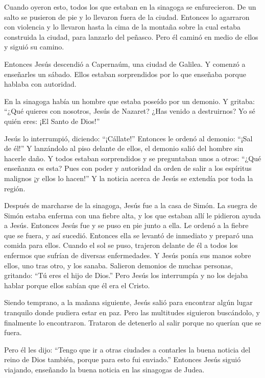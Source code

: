  Cuando oyeron esto, todos los que estaban en la sinagoga
se enfurecieron.  De un salto se pusieron de pie y lo
llevaron fuera de la ciudad. Entonces lo agarraron con violencia y lo
llevaron hasta la cima de la montaña sobre la cual estaba construida la
ciudad, para lanzarlo del peñasco.  Pero él caminó en medio
de ellos y siguió su camino.

 Entonces Jesús descendió a Capernaúm, una ciudad de
Galilea. Y comenzó a enseñarles un sábado.  Ellos estaban
sorprendidos por lo que enseñaba porque hablaba con autoridad.

 En la sinagoga había un hombre que estaba poseído por un
demonio. Y gritaba:  ``¿Qué quieres con nosotros, Jesús de
Nazaret? ¿Has venido a destruirnos? Yo sé quién eres: ¡El Santo de
Dios!''

 Jesús lo interrumpió, diciendo: ``¡Cállate!'' Entonces le
ordenó al demonio: ``¡Sal de él!'' Y lanzándolo al piso delante de
ellos, el demonio salió del hombre sin hacerle daño.  Y
todos estaban sorprendidos y se preguntaban unos a otros: ``¿Qué
enseñanza es esta? Pues con poder y autoridad da orden de salir a los
espíritus malignos ¡y ellos lo hacen!''  Y la noticia
acerca de Jesús se extendía por toda la región.

 Después de marcharse de la sinagoga, Jesús fue a la casa
de Simón. La suegra de Simón estaba enferma con una fiebre alta, y los
que estaban allí le pidieron ayuda a Jesús.  Entonces Jesús
fue y se puso en pie junto a ella. Le ordenó a la fiebre que se fuera, y
así sucedió. Entonces ella se levantó de inmediato y preparó una comida
para ellos.  Cuando el sol se puso, trajeron delante de él
a todos los enfermos que sufrían de diversas enfermedades. Y Jesús ponía
sus manos sobre ellos, uno tras otro, y los sanaba. 
Salieron demonios de muchas personas, gritando: ``Tú eres el hijo de
Dios.'' Pero Jesús los interrumpía y no los dejaba hablar porque ellos
sabían que él era el Cristo.

 Siendo temprano, a la mañana siguiente, Jesús salió para
encontrar algún lugar tranquilo donde pudiera estar en paz. Pero las
multitudes siguieron buscándolo, y finalmente lo encontraron. Trataron
de detenerlo al salir porque no querían que se fuera.

 Pero él les dijo: ``Tengo que ir a otras ciudades a
contarles la buena noticia del reino de Dios también, porque para esto
fui enviado.''  Entonces Jesús siguió viajando, enseñando
la buena noticia en las sinagogas de Judea.

